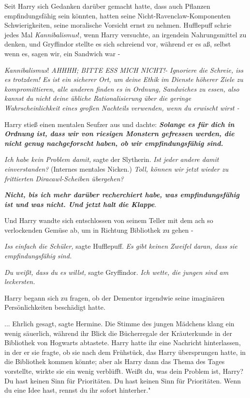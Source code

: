 Seit Harry sich Gedanken darüber gemacht hatte, dass auch Pflanzen
empfindungsfähig sein könnten, hatten seine Nicht-Ravenclaw-Komponenten
Schwierigkeiten, seine moralische Vorsicht ernst zu nehmen. Hufflepuff schrie
jedes Mal \glqq \emph{Kannibalismus}!\grqq{}, wenn Harry versuchte, an irgendein
Nahrungsmittel zu denken, und Gryffindor stellte es sich schreiend vor, während
er es aß, selbst wenn es, sagen wir, ein Sandwich war -

\emph{Kannibalismus}!
\emph{AHHHH; BITTE ESS MICH NICHT!-}
\emph{Ignoriere die Schreie, iss es trotzdem! Es ist ein sicherer Ort, um deine Ethik im Dienste höherer Ziele zu kompromittieren, alle anderen finden es in Ordnung, Sandwiches zu essen, also kannst du nicht deine übliche Rationalisierung über die geringe Wahrscheinlichkeit eines großen Nachteils verwenden, wenn du erwischt wirst -}

Harry stieß einen mentalen Seufzer aus und dachte: \textbf{\emph{Solange es für
dich in Ordnung ist, dass wir von riesigen Monstern gefressen werden, die nicht
genug nachgeforscht haben, ob wir empfindungsfähig sind. }}

\emph{Ich habe kein Problem damit,} sagte der Slytherin. \emph{Ist jeder andere
damit einverstanden?} (Internes mentales Nicken.) \emph{Toll, können wir jetzt
wieder zu frittierten Diracawl-Scheiben übergehen?}

\textbf{\emph{Nicht, bis ich mehr darüber recherchiert habe, was
empfindungsfähig ist und was nicht. Und jetzt halt die Klappe}}.

Und Harry wandte sich entschlossen von seinem Teller mit dem ach so verlockenden
Gemüse ab, um in Richtung Bibliothek zu gehen -

\emph{Iss einfach die Schüler,} sagte Hufflepuff.
\emph{Es gibt keinen Zweifel daran, dass sie empfindungsfähig sind.}

\emph{Du weißt, dass du es willst, }sagte Gryffindor.
\emph{Ich wette, die jungen sind am leckersten.}

Harry begann sich zu fragen, ob der Dementor irgendwie seine imaginären
Persönlichkeiten beschädigt hatte.

... \glqq Ehrlich gesagt\grqq{}, sagte Hermine. Die Stimme des jungen Mädchens
klang ein wenig säuerlich, während ihr Blick die Bücherregale der Kräuterkunde
in der Bibliothek von Hogwarts abtastete. Harry hatte ihr eine Nachricht
hinterlassen, in der er sie fragte, ob sie nach dem Frühstück, das Harry
übersprungen hatte, in die Bibliothek kommen könnte; aber als Harry dann das
Thema des Tages vorstellte, wirkte sie ein wenig verblüfft. \glqq Weißt du, was
dein Problem ist, Harry? Du hast keinen Sinn für Prioritäten. Du hast keinen
Sinn für Prioritäten. Wenn du eine Idee hast, rennst du ihr sofort hinterher."


